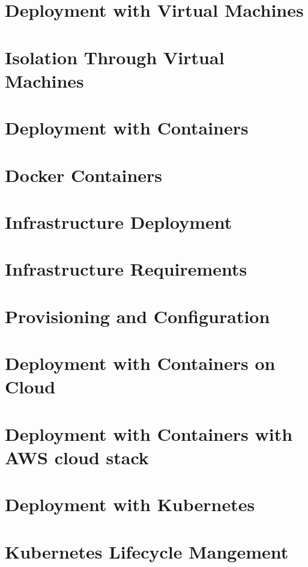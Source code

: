 \documentclass[11pt]{article}
\begin{document}
\section{Deployment with Virtual Machines}

\section{Isolation Through Virtual Machines}

\section{Deployment with Containers}

\section{Docker Containers}

\section{Infrastructure Deployment}

\section{Infrastructure Requirements}

\section{Provisioning and Configuration}

\section{Deployment with Containers on Cloud}

\section{Deployment with Containers with AWS cloud stack}

\section{Deployment with Kubernetes}

\section{Kubernetes Lifecycle Mangement}
\end{document}
